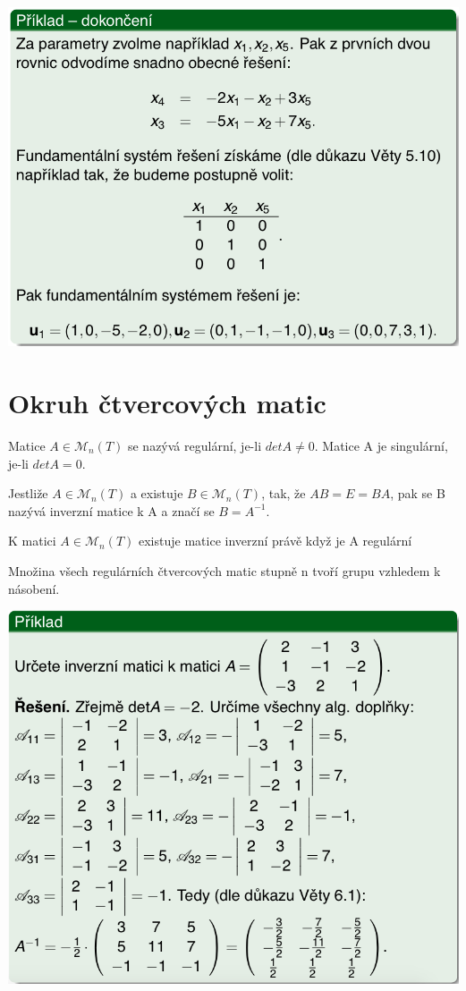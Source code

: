 \includegraphics[scale=0.5]{img/LinSoust4}

\section{Okruh čtvercových matic}
\begin{definition}
	Matice $A \in \mathscr{M}_n(T)$ se nazývá regulární, je-li  $detA \not= 0$. Matice A je singulární, je-li $detA = 0$. 
\end{definition}

\begin{definition}
	Jestliže $A \in \mathscr{M}_n(T)$ a existuje $B \in \mathscr{M}_n(T)$, tak, že $AB = E = BA$, pak se B nazývá inverzní matice k A a značí se $B = A^{-1}$.	
\end{definition}

\begin{sentence}
	K matici $A \in \mathscr{M}_n(T)$ existuje matice inverzní právě když je A regulární
\end{sentence}

\begin{sentence}
	Množina všech regulárních čtvercových matic stupně n tvoří grupu vzhledem k násobení.
\end{sentence}

\includegraphics[scale=0.55]{img/InverzniMatice}
\newpage
